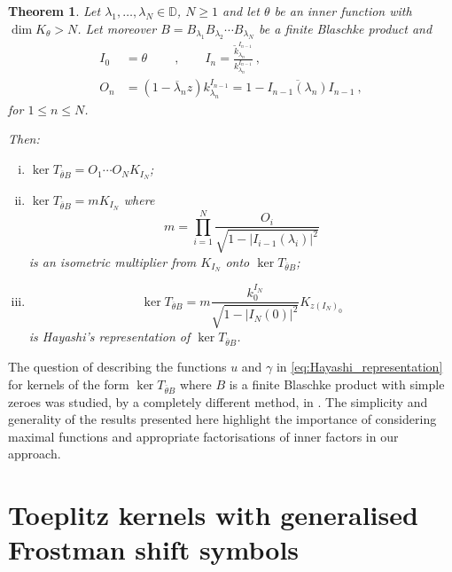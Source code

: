 \documentclass{article}
\numberwithin{equation}{section}
\theoremstyle{plain}
\newtheorem{thm}{Theorem}[section]
\newcommand{\DD}{\ensuremath{\mathbb{D}}}
\newcommand{\ol}[1]{\ensuremath{\overline{#1}}}
\begin{document}
\begin{thm}
\label{thm:model_space_repres_ker_theta_B}
Let $\lambda_1, \dots, \lambda_N \in\DD$, $N\geq 1$ and let $\theta$ be an inner function with $\dim K_\theta > N$.
Let moreover $B = B_{\lambda_1} B_{\lambda_2} \cdots B_{\lambda_N}$ be a finite Blaschke product and
\begin{align}
I_0 &= \theta \qquad \ , \qquad I_n = \frac{\tilde k_{\lambda_n}^{I_{n-1}}}{k_{\lambda_n}^{I_{n-1}}}\ , \\
O_n &= (1-\ol\lambda_n z) k_{\lambda_n}^{I_{n-1}} = 1-\ol{I_{n-1}(\lambda_n)} I_{n-1}\ ,
\end{align}
for $1\leq n \leq N$.

Then:
\begin{enumerate}[(i)]
\item $\ker T_{\ol\theta B} = O_1 \cdots O_N K_{I_N}$;

\item $\ker T_{\ol\theta B} = m K_{I_N}$
where
\begin{equation}
m = \prod_{i=1}^N \frac{O_i}{\sqrt{1 - |I_{i-1}(\lambda_i)|^2}}
\end{equation}
is an isometric multiplier from $K_{I_N}$ onto $\ker T_{\ol\theta B}$;

\item
\begin{equation}
\ker T_{\ol\theta B} = m \frac{k_0^{I_N}}{\sqrt{1-|I_N(0)|^2}} K_{z {(I_N)}_0}
\end{equation}
is Hayashi's representation of $\ker T_{\ol\theta B}$.
\end{enumerate}
\end{thm}

The question of describing the functions $u$ and $\gamma$ in \eqref{eq:Hayashi_representation} for kernels of the form $\ker T_{\ol\theta B}$ where $B$ is a finite Blaschke product with simple zeroes was studied, by a completely different method, in \cite{Kapustin18}.
The simplicity and generality of the results presented here highlight the importance of considering maximal functions and appropriate factorisations of inner factors in our approach.








\section{Toeplitz kernels with generalised Frostman shift symbols}
\label{sec:Tkernels_gen_Frostman_shift_isometric_multipliers}
\end{document}
